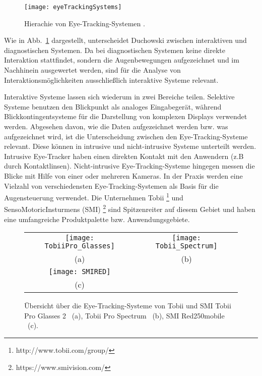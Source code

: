 \begin{figure}
\centering
\texttt{[image: eyeTrackingSystems]}
\caption{Hierachie von Eye-Tracking-Systemen \cite{Duchowski}.}
\label{fig:eyeTrackingSystems}
\end{figure}
\newline \newline
Wie in Abb.~\ref{fig:eyeTrackingSystems} dargestellt, unterscheidet Duchowski \cite{Duchowski} zwischen interaktiven und diagnostischen Systemen. Da bei diagnostischen Systemen keine direkte Interaktion stattfindet, sondern die Augenbewegungen aufgezeichnet und im Nachhinein ausgewertet werden, sind für die Analyse von Interaktionsmöglichkeiten ausschließlich interaktive Systeme relevant. 

Interaktive Systeme lassen sich wiederum in zwei Bereiche teilen. Selektive Systeme benutzen den Blickpunkt als analoges Eingabegerät, während Blickkontingentsysteme für die Darstellung von komplexen Displays verwendet werden. 
\newline \newline
Abgesehen davon, wie die Daten aufgezeichnet werden bzw. was aufgezeichnet wird, ist die Unterscheidung zwischen den Eye-Tracking-Systeme relevant. Diese können in intrusive und nicht-intrusive Systeme unterteilt werden. Intrusive Eye-Tracker haben einen direkten Kontakt mit den Anwendern (z.B durch Kontaktlinsen). Nicht-intrusive Eye-Tracking-Systeme hingegen messen die Blicke mit Hilfe von einer oder mehreren Kameras. 
\newline \newline
In der Praxis werden eine Vielzahl von verschiedensten Eye-Tracking-Systemen als Basis für die Augensteuerung verwendet. Die Unternehmen Tobii %
\footnote{http://www.tobii.com/group/}
%
und SensoMotoricInsturmens (SMI) %
\footnote{https://www.smivision.com/}
%
sind Spitzenreiter auf diesem Gebiet und haben eine umfangreiche Produktpalette bzw. Anwendungsgebiete. 
\begin{figure}
\centering\small
\setlength{\tabcolsep}{0mm}	%
\begin{tabular}{c@{\hspace{-15mm}}c} %
  \texttt{[image: TobiiPro\_Glasses]} &
  \texttt{[image: Tobii\_Spectrum]}
\\
  (a) & (b)
\\[4pt]	%
  \texttt{[image: SMIRED]}
\\
  (c)
\end{tabular}
%
\caption{Übersicht über die Eye-Tracking-Systeme von Tobii und SMI \newline
Tobii Pro Glasses 2 \cite{TobiiGlasses}~(a), Tobii Pro Spectrum \cite{TobiiSpectrum}~(b), 
SMI Red250mobile \cite{SMIRED} ~(c).}
\label{fig:Tobii}
\end{figure}

